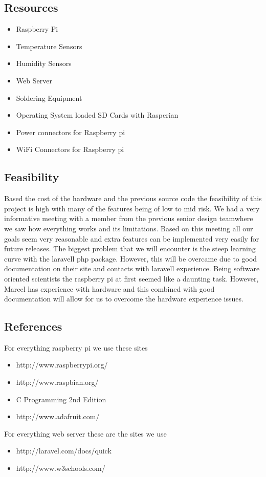 \documentclass{report}
\begin{document}
\subsection*{Resources}
\begin{itemize}
\item Raspberry Pi
\item Temperature Sensors
\item Humidity Sensors
\item Web Server
\item Soldering Equipment
\item Operating System loaded SD Cards with Rasperian
\item Power connectors for Raspberry pi
\item WiFi Connectors for Raspberry pi
\end{itemize}
\newpage
\subsection*{Feasibility}
Based the cost of the hardware and the previous source code the feasibility of this project is high with many of the features being of low to mid risk. 
We had a very informative meeting with a member from the previous senior design teamwhere we saw how everything works and its limitations.
Based on this meeting all our goals seem very reasonable and extra features can be implemented very easily for future releases.
The biggest problem that we will encounter is the steep learning curve with the laravell php package.
However, this will be overcame due to good documentation on their site and contacts with laravell experience.
Being software oriented scientists the raspberry pi at first seemed like a daunting task. 
However, Marcel has experience with hardware and this combined with good documentation will allow for us to overcome the hardware experience issues.

\newpage
\subsection*{References}
For everything raspberry pi we use these sites
\begin{itemize}
\item http://www.raspberrypi.org/
\item http://www.raspbian.org/
\item C Programming 2nd Edition
\item http://www.adafruit.com/
\end{itemize}
For everything web server these are the sites we use
\begin{itemize}
\item http://laravel.com/docs/quick
\item http://www.w3schools.com/
\end{itemize}
\newpage
\end{document}
